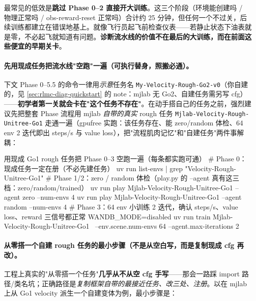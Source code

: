 \begin{insight}\label{ins:rlmc-diag-phases}
最常见的低效是\textbf{跳过 Phase 0--2 直接开大训练}。这三个阶段（环境能创建吗 / 物理正常吗 / obs-reward-reset 正常吗）合计约 25 分钟，但任何一个不过关，后续训练都建立在错误地基上。就像飞行员起飞前检查仪表——若静止状态下油表就是零，不必起飞就知道有问题。\textbf{诊断流水线的价值不在最后的大训练，而在前面这些便宜的早期关卡}。
\end{insight}

\paragraph{先用现成任务把流水线"空跑"一遍（可执行替身，照搬必通）。}下文 Phase 0--5.5 的命令一律用\emph{示意}任务名 \verb|My-Velocity-Rough-Go2-v0|（你自建的，见 \cref{sec:rlmc-diag-quickstart} 的 note：mjlab 无 Go2、自建任务需另写 cfg）——\textbf{初学者第一关就会卡在"这个任务不存在"}。在动手搭自己的任务之前，强烈建议先把整套 Phase 流程用 mjlab \emph{自带的真实} rough 任务 \verb|Mjlab-Velocity-Rough-Unitree-Go1| 走通一遍（gpufree 实跑：该任务存在、能 zero/random 体检、64 env 2 迭代即出 steps/s 与 value loss），把"流程肌肉记忆"和"自建任务"两件事解耦：

\begin{codebox}[bash]{用现成 Go1 rough 任务把 Phase 0--3 空跑一遍（每条都实跑可通）}
# Phase 0：现成任务一定在册（不必先建任务）
uv run list-envs | grep "Velocity-Rough-Unitree-Go1"
# Phase 1/2：zero / random 体检（play.py 的 --agent 真有这三档：zero/random/trained）
uv run play Mjlab-Velocity-Rough-Unitree-Go1 --agent zero   --num-envs 4
uv run play Mjlab-Velocity-Rough-Unitree-Go1 --agent random --num-envs 4
# Phase 3：64 env 小训练 2 迭代，确认 steps/s、value loss、reward 三信号都正常
WANDB_MODE=disabled uv run train Mjlab-Velocity-Rough-Unitree-Go1 \
  --env.scene.num-envs 64 --agent.max-iterations 2
\end{codebox}

\paragraph{从零搭一个自建 rough 任务的最小步骤（不是从空白写，而是复制现成 cfg 再改）。}工程上真实的"从零搭一个任务"\textbf{几乎从不从空 cfg 手写}——那会一路踩 import 路径/类名坑；正确路径是\emph{复制框架自带的最接近任务、改三处、注册}。以在 mjlab 上从 Go1 velocity 派生一个自建变体为例，最小步骤是：

